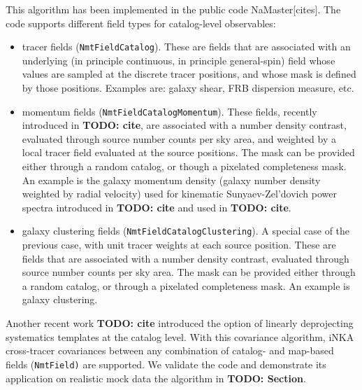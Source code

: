 \documentclass[aps,twocolumn, superscriptaddress, english, nofootinbib, 10pt]{revtex4-2}
\newcommand{\todo}[1]{{\color{blue}\bf TODO: #1}}
\begin{document}
    This algorithm has been implemented in the public code NaMaster[cites]. The code supports different field types for catalog-level observables:
    \begin{itemize}
        \item tracer fields (\texttt{NmtFieldCatalog}). These are fields that are associated with an underlying (in principle continuous, in principle general-spin) field whose values are sampled at the discrete tracer positions, and whose mask is defined by those positions. Examples are: galaxy shear, FRB dispersion measure, etc.
        \item momentum fields (\texttt{NmtFieldCatalogMomentum}). These fields, recently introduced in \todo{cite}, are associated with a number density contrast, evaluated through source number counts per sky area, and weighted by a local tracer field evaluated at the source positions. The mask can be provided either through a random catalog, or though a pixelated completeness mask. An example is the galaxy momentum density (galaxy number density weighted by radial velocity) used for kinematic Sunyaev-Zel'dovich power spectra introduced in \todo{cite} and used in \todo{cite}.
        \item galaxy clustering fields (\texttt{NmtFieldCatalogClustering}). A special case of the previous case, with unit tracer weights at each source position. These are fields that are associated with a number density contrast, evaluated through source number counts per sky area. The mask can be provided either through a random catalog, or through a pixelated completeness mask. An example is galaxy clustering.
    \end{itemize}
    Another recent work \todo{cite} introduced the option of linearly deprojecting systematics templates at the catalog level. With this covariance algorithm, iNKA cross-tracer covariances between any combination of catalog- and map-based fields (\texttt{NmtField)} are supported. We validate the code and demonstrate its application on realistic mock data the algorithm in \todo{Section}. 
\end{document}
